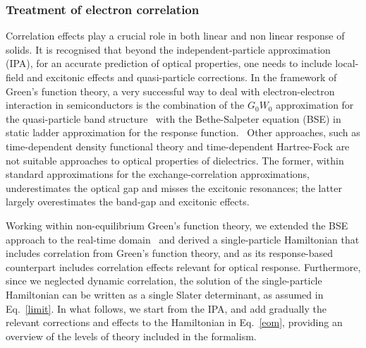 \subsubsection{Treatment of electron correlation}\label{ss:correff}
Correlation effects play a crucial role in both linear\cite{Onida} and non linear\cite{PhysRevB.82.235201,PhysRevB.80.155205} response of solids. It is recognised that beyond the independent-particle approximation (IPA), for an accurate prediction of optical properties, one needs to include local-field and excitonic effects and quasi-particle corrections. In the framework of Green's function theory, a very successful way to deal with electron-electron interaction in semiconductors is the combination of the $G_0W_0$ approximation for the quasi-particle band structure~\cite{PhysRevB.25.2867} with the Bethe-Salpeter equation (BSE) in static ladder approximation for the response function.~\cite{strinati} Other approaches, such as time-dependent density functional theory and time-dependent Hartree-Fock are not suitable approaches to optical properties of dielectrics. The former, within standard approximations for the exchange-correlation approximations, underestimates the optical gap and misses the excitonic resonances; the latter largely overestimates the band-gap and excitonic effects.

Working within non-equilibrium Green's function theory, we extended the BSE approach to the real-time domain~\cite{attaccalite} and derived a single-particle Hamiltonian that includes correlation from Green's function theory, and as its response-based counterpart includes correlation effects relevant for optical response. Furthermore, since we neglected dynamic correlation, the solution of the single-particle Hamiltonian can be written as a single Slater determinant, as assumed in Eq.~\eqref{limit}. In what follows, we start from the IPA, and add gradually the relevant corrections and effects to the Hamiltonian in Eq.~\ref{eom}, providing an overview of the levels of theory included in the formalism.   


